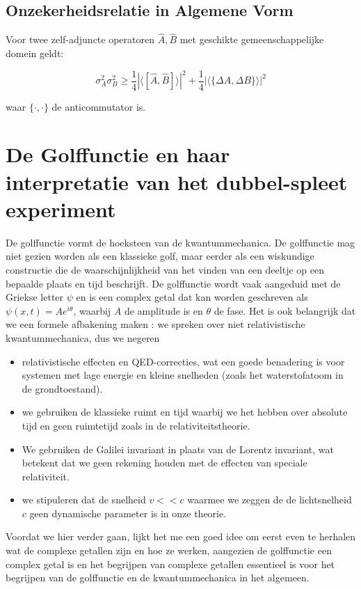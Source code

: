 \documentclass{report} %
\begin{document}
    \section{Onzekerheidsrelatie in Algemene Vorm}

    Voor twee zelf-adjuncte operatoren $\hat{A},\hat{B}$
    met geschikte gemeenschappelijke domein geldt:

    \begin{equation}
        \sigma_A^2 \sigma_B^2
        \ge
        \frac{1}{4}
        \left|
            \langle [\hat{A},\hat{B}] \rangle
        \right|^2
        +
        \frac{1}{4}
        \left|
            \langle \{\Delta A,\Delta B\} \rangle
        \right|^2
    \end{equation}

    waar $\{\cdot,\cdot\}$ de anticommutator is.


    \chapter{De Golffunctie en haar interpretatie van het dubbel-spleet experiment}
    De golffunctie vormt de hoeksteen van de kwantummechanica. De golffunctie mag niet gezien worden als een klassieke golf, maar eerder als een wiskundige constructie
    die de waarschijnlijkheid van het vinden van een deeltje op een bepaalde plaats en tijd beschrijft.
    De golffunctie wordt vaak aangeduid met de Griekse letter $\psi$ en is een complex getal dat kan worden geschreven als $\psi(x,t) = A e^{i\theta}$, waarbij $A$ de amplitude is en $\theta$ de fase.
    Het is ook belangrijk dat we een formele afbakening maken : we spreken over niet relativistische kwantummechanica, dus we negeren
    \begin{itemize}
        \item relativistische effecten en QED-correcties, wat een goede benadering is voor systemen met lage energie en kleine snelheden (zoals het waterstofatoom in de grondtoestand).
        \item we gebruiken de klassieke ruimt en tijd waarbij we het hebben over absolute tijd en geen ruimtetijd zoals in de relativiteitstheorie.
        \item We gebruiken de Galilei invariant in plaats van de Lorentz invariant, wat betekent dat we geen rekening houden met de effecten van speciale relativiteit.
        \item we stipuleren dat de snelheid  $v<<c$ waarmee we zeggen de de lichtsnelheid $c$ geen dynamische parameter is in onze theorie.
    \end{itemize}
    Voordat we hier verder gaan, lijkt het me een goed idee om eerst even te herhalen wat de complexe getallen zijn en hoe ze werken,
    aangezien de golffunctie een complex getal is en het begrijpen van complexe getallen essentieel is voor het begrijpen van de golffunctie en de kwantummechanica in het algemeen.
\end{document}
